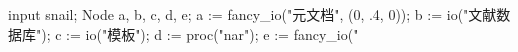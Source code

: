 \usemodule[zhfonts]
\startMPpage
input snail;
Node a, b, c, d, e;
a := fancy_io("元文档", (0, .4, 0));
b := io("文献数据库");
c := io("模板");
d := proc("nar");
e := fancy_io("
\stopMPpage
